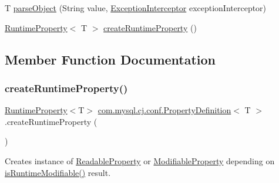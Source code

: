 \begin{DoxyCompactItemize}
\item 
T \mbox{\hyperlink{interfacecom_1_1mysql_1_1cj_1_1conf_1_1_property_definition_a6abfb25b6102c876eddc4f10aca5687c}{parse\+Object}} (String value, \mbox{\hyperlink{interfacecom_1_1mysql_1_1cj_1_1exceptions_1_1_exception_interceptor}{Exception\+Interceptor}} exception\+Interceptor)
\item 
\mbox{\hyperlink{interfacecom_1_1mysql_1_1cj_1_1conf_1_1_runtime_property}{Runtime\+Property}}$<$ T $>$ \mbox{\hyperlink{interfacecom_1_1mysql_1_1cj_1_1conf_1_1_property_definition_a60e957593314e41c73275bd5f4c6708e}{create\+Runtime\+Property}} ()
\end{DoxyCompactItemize}


\subsection{Member Function Documentation}
\mbox{\label{interfacecom_1_1mysql_1_1cj_1_1conf_1_1_property_definition_a60e957593314e41c73275bd5f4c6708e}} 
\subsubsection{\texorpdfstring{create\+Runtime\+Property()}{createRuntimeProperty()}}
{\footnotesize\ttfamily \mbox{\hyperlink{interfacecom_1_1mysql_1_1cj_1_1conf_1_1_runtime_property}{Runtime\+Property}}$<$T$>$ \mbox{\hyperlink{interfacecom_1_1mysql_1_1cj_1_1conf_1_1_property_definition}{com.\+mysql.\+cj.\+conf.\+Property\+Definition}}$<$ T $>$.create\+Runtime\+Property (\begin{DoxyParamCaption}{ }\end{DoxyParamCaption})}

Creates instance of \mbox{\hyperlink{interfacecom_1_1mysql_1_1cj_1_1conf_1_1_readable_property}{Readable\+Property}} or \mbox{\hyperlink{interfacecom_1_1mysql_1_1cj_1_1conf_1_1_modifiable_property}{Modifiable\+Property}} depending on \mbox{\hyperlink{interfacecom_1_1mysql_1_1cj_1_1conf_1_1_property_definition_a72d0e665c12ca2bfa7c2fd6cf7d50656}{is\+Runtime\+Modifiable()}} result.


